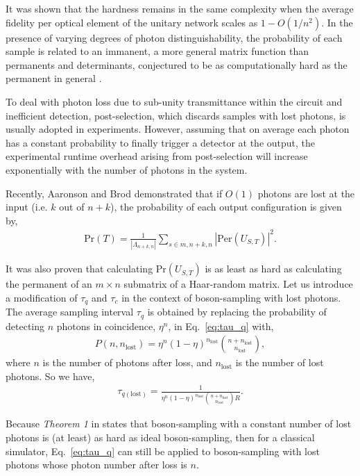 \documentclass[aps,rmp,twocolumn,amsmath,amssymb,nofootinbib,superscriptaddress]{revtex4}
\newcommand{\comment}[1]{{\color{blue}{#1}}}
\begin{document}
It was shown that the hardness remains in the same complexity when the average fidelity per optical element of the unitary network scales as \mbox{$1-O(1/n^2)$}. In the presence of varying degrees of photon distinguishability, the probability of each sample is related to an immanent, a more general matrix function than permanents and determinants, conjectured to be as computationally hard as the permanent in general \cite{bib:31, bib:32}.

To deal with photon loss due to sub-unity transmittance within the circuit and inefficient detection, post-selection, which discards samples with lost photons, is usually adopted in experiments. However, assuming that on average each photon has a constant probability to finally trigger a detector at the output, the experimental runtime overhead arising from post-selection will increase exponentially with the number of photons in the system.

Recently, Aaronson and Brod \cite{bib:33} demonstrated that if $O(1)$ photons are lost at the input (i.e. $k$ out of \mbox{$n+k$}), the probability of each output configuration is given by,
\begin{align}
\mathrm{Pr}(T) = \frac{1}{|\Lambda_{n+k,n}|} \sum_{s\in m,n+k,n} |\mathrm{Per}(U_{S,T})|^2.
\end{align}
\comment{Need to define $\Lambda$ and meaning of $s\in m,n+k,n$.}

It was also proven that calculating $\mathrm{Pr}(U_{S,T})$ is as least as hard as calculating the permanent of an \mbox{$m\times n$} submatrix of a Haar-random matrix. Let us introduce a modification of $\tau_q$ and $\tau_c$ in the context of boson-sampling with lost photons. The average sampling interval $\tau_q$ is obtained by replacing the probability of detecting $n$ photons in coincidence, $\eta^n$, in Eq.~\ref{eq:tau_q} with,
\begin{align}
P(n,n_\mathrm{lost}) = \eta^n(1-\eta)^{n_\mathrm{lost}}\binom{n+n_\mathrm{lost}}{n_\mathrm{lost}},
\end{align}
where $n$ is the number of photons after loss, and $n_\mathrm{lost}$ is the number of lost photons. So we have,
\begin{align}
\tau_{q(\mathrm{lost})} = \frac{1}{\eta^n(1-\eta)^{n_\mathrm{lost}}\binom{n+n_
\mathrm{lost}}{n_\mathrm{lost}}R}.
\end{align}

Because \emph{Theorem 1} in \cite{bib:33} states that boson-sampling with a constant number of lost photons is (at least) as hard as ideal boson-sampling, then for a classical simulator, Eq.~\ref{eq:tau_q} can still be applied to boson-sampling with lost photons whose photon number after loss is $n$.
\end{document}
